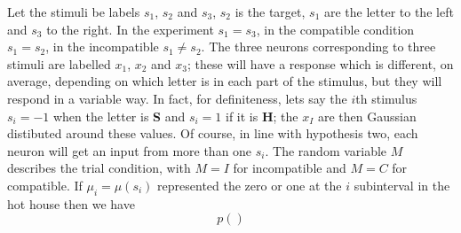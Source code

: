 \documentclass[12pt]{article}
\begin{document}
Let the stimuli be labels $s_1$, $s_2$ and $s_3$, $s_2$ is the target,
$s_1$ are the letter to the left and $s_3$ to the right. In the
experiment $s_1=s_3$, in the compatible condition $s_1=s_2$, in the
incompatible $s_1\not=s_2$. The three neurons corresponding to three
stimuli are labelled $x_1$, $x_2$ and $x_3$; these will have a
response which is different, on average, depending on which letter is
in each part of the stimulus, but they will respond in a variable
way. In fact, for definiteness, lets say the $i$th stimulus $s_i=-1$
when the letter is \textbf{S} and $s_i=1$ if it is \textbf{H}; the
$x_I$ are then Gaussian distibuted around these values. Of course, in
line with hypothesis two, each neuron will get an input from more than
one $s_i$. The random variable $M$ describes the trial condition, with
$M=I$ for incompatible and $M=C$ for compatible. If $\mu_i=\mu(s_i)$
represented the zero or one at the $i$ subinterval in the hot house
then we have
\begin{equation}
p(\textbf{})
\end{equation}
\end{document}
